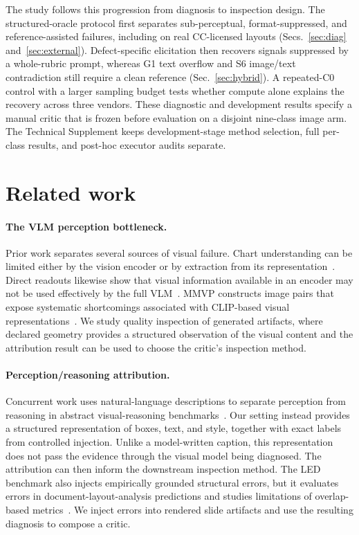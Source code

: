 \documentclass[letterpaper]{article}            %
\newcommand{\g}[1]{\textsf{#1}}        %
\begin{document}
The study follows this progression from diagnosis to inspection design. The structured-oracle protocol first
separates sub-perceptual, format-suppressed, and reference-assisted failures, including on real CC-licensed
layouts (Secs.~\ref{sec:diag} and~\ref{sec:external}). Defect-specific elicitation then recovers signals
suppressed by a whole-rubric prompt, whereas \g{G1} text overflow and \g{S6} image/text contradiction still
require a clean reference (Sec.~\ref{sec:hybrid}). A repeated-C0 control with a larger sampling budget tests
whether compute alone explains the recovery across three vendors. These diagnostic and development results
specify a manual critic that is frozen before evaluation on a disjoint nine-class image arm. The Technical
Supplement keeps development-stage method selection, full per-class results, and post-hoc executor audits
separate.

\section{Related work}

\paragraph{The VLM perception bottleneck.}
Prior work separates several sources of visual failure. Chart understanding can be limited either by the
vision encoder or by extraction from its representation~\citep{chartbottleneck}. Direct readouts likewise show
that visual information available in an encoder may not be used effectively by the full VLM~\citep{hiddeninplainsight}.
\textsc{MMVP} constructs image pairs that expose systematic shortcomings associated with CLIP-based visual
representations~\citep{mmvp}. We study quality inspection of generated artifacts, where declared geometry
provides a structured observation of the visual content and the attribution result can be used to choose the
critic's inspection method.

\paragraph{Perception/reasoning attribution.}
Concurrent work uses natural-language descriptions to separate perception from reasoning in abstract
visual-reasoning benchmarks~\citep{reasoningbench}. Our setting instead provides a structured representation of
boxes, text, and style, together with exact labels from controlled injection. Unlike a model-written caption, this representation does not pass the evidence through the visual model being
diagnosed. The attribution can then inform the downstream inspection method. The \textsc{LED}
benchmark also injects empirically grounded structural errors, but it evaluates errors in document-layout-analysis
predictions and studies limitations of overlap-based metrics~\citep{led}. We inject errors into rendered slide
artifacts and use the resulting diagnosis to compose a critic.
\end{document}
